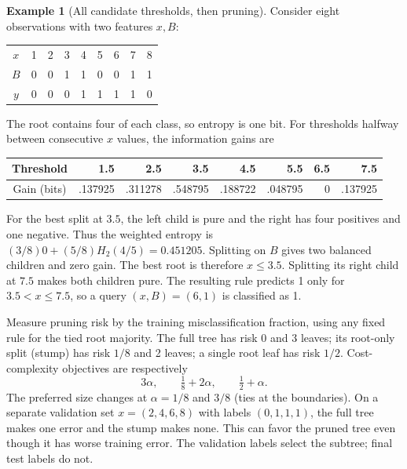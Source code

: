 \documentclass[11pt,twoside]{article}
\numberwithin{equation}{section}
\theoremstyle{plain}
\theoremstyle{definition}
\newtheorem{example}[theorem]{Example}
\theoremstyle{remark}
\begin{document}
\begin{example}[All candidate thresholds, then pruning]
Consider eight observations with two features $x,B$:
\begin{center}
\begin{tabular}{c|rrrrrrrr}
$x$&1&2&3&4&5&6&7&8\\
$B$&0&0&1&1&0&0&1&1\\
$y$&0&0&0&1&1&1&1&0
\end{tabular}
\end{center}
The root contains four of each class, so entropy is one bit. For thresholds halfway between consecutive $x$ values, the information gains are
\begin{center}
\begin{tabular}{c|rrrrrrr}
Threshold&1.5&2.5&3.5&4.5&5.5&6.5&7.5\\\hline
Gain (bits)&.137925&.311278&.548795&.188722&.048795&0&.137925
\end{tabular}
\end{center}
For the best split at $3.5$, the left child is pure and the right has four positives and one negative. Thus the weighted entropy is $(3/8)0+(5/8)H_2(4/5)=0.451205$. Splitting on $B$ gives two balanced children and zero gain. The best root is therefore $x\le3.5$. Splitting its right child at $7.5$ makes both children pure. The resulting rule predicts 1 only for $3.5<x\le7.5$, so a query $(x,B)=(6,1)$ is classified as 1.

Measure pruning risk by the training misclassification fraction, using any fixed rule for the tied root majority. The full tree has risk 0 and 3 leaves; its root-only split (stump) has risk $1/8$ and 2 leaves; a single root leaf has risk $1/2$. Cost-complexity objectives are respectively
\[
3\alpha,\qquad\tfrac18+2\alpha,\qquad\tfrac12+\alpha.
\]
The preferred size changes at $\alpha=1/8$ and $3/8$ (ties at the boundaries). On a separate validation set $x=(2,4,6,8)$ with labels $(0,1,1,1)$, the full tree makes one error and the stump makes none. This can favor the pruned tree even though it has worse training error. The validation labels select the subtree; final test labels do not.
\end{example}
\end{document}
